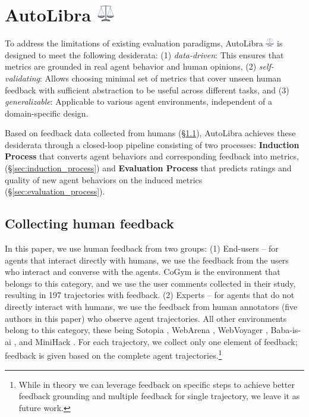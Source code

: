 \section{\texorpdfstring{AutoLibra \includegraphics[height=1em]{figs/scale.png}}{AutoLibra}}

To address the limitations of existing evaluation paradigms, AutoLibra \protect\includegraphics[height=1em]{figs/scale.png} is designed to
meet the following desiderata: (1) \emph{data-driven}: This ensures that metrics are grounded
in real agent behavior and human opinions,  (2) \emph{self-validating}: Allows choosing minimal set of metrics that cover unseen human feedback with sufficient abstraction to be useful across different tasks, and (3) \emph{generalizable}: Applicable to various agent environments, independent of a domain-specific design.

Based on feedback data collected from humans (\S\ref{sec:collecting-human-feedback}), AutoLibra achieves these desiderata through a closed-loop pipeline
consisting of two processes: \textbf{Induction Process} that converts agent behaviors and corresponding feedback into metrics, (\S\ref{sec:induction_process}) and \textbf{Evaluation Process} that predicts ratings and quality of new agent behaviors on the induced metrics (\S\ref{sec:evaluation_process}). 


\subsection{Collecting human feedback}
\label{sec:collecting-human-feedback}
In this paper, we use human feedback from two groups: (1) End-users -- for agents that interact directly with humans, we use the feedback from the users who interact and converse with the agents. CoGym \citep{shao2024collaborative}
is the environment that belongs to this category, and we use the user comments collected in their study, resulting
in 197 trajectories with feedback. (2) Experts -- for agents that
do not directly interact with humans, we use the feedback from human annotators (five authors in this paper) who observe agent trajectories. All other environments belong to this category, these being Sotopia \citep{zhousotopia}, WebArena \citep{zhouwebarena}, WebVoyager \citep{he2024webvoyager}, Baba-is-ai \citep{cloos2024babaaibreakrules}, and MiniHack \citep{samvelyan2021minihackplanetsandboxopenended}. For each trajectory, we collect only one element of feedback; feedback is given based on the complete agent trajectories.\footnote{While in theory we can leverage feedback on specific steps to achieve better feedback grounding and multiple feedback for single trajectory, we leave it as future work.}

